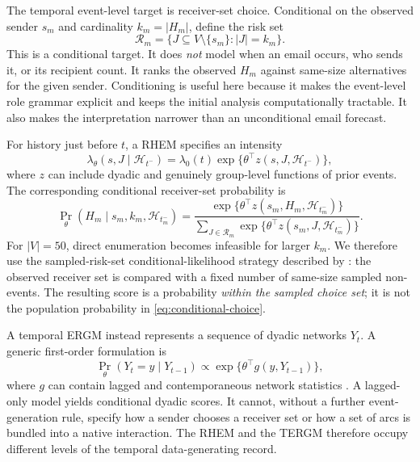 \documentclass[11pt]{article}
\newcommand{\Hist}{\mathcal{H}}
\newcommand{\Risk}{\mathcal{R}}
\begin{document}
The temporal event-level target is receiver-set choice. Conditional on the observed sender $s_m$ and cardinality $k_m=|H_m|$, define the risk set
\begin{equation}
 \Risk_m=\{J\subseteq V\setminus\{s_m\}:|J|=k_m\}.
 \label{eq:riskset}
\end{equation}
This is a conditional target. It does \emph{not} model when an email occurs, who sends it, or its recipient count. It ranks the observed $H_m$ against same-size alternatives for the given sender. Conditioning is useful here because it makes the event-level role grammar explicit and keeps the initial analysis computationally tractable. It also makes the interpretation narrower than an unconditional email forecast.

For history just before $t$, a RHEM specifies an intensity
\begin{equation}
 \lambda_\theta(s,J\mid\Hist_{t^-})=\lambda_0(t)\exp\{\theta^\top z(s,J,\Hist_{t^-})\},
 \label{eq:rhem-intensity}
\end{equation}
where $z$ can include dyadic and genuinely group-level functions of prior events. The corresponding conditional receiver-set probability is
\begin{equation}
 \Pr_\theta(H_m\mid s_m,k_m,\Hist_{t_m^-})=
 \frac{\exp\{\theta^\top z(s_m,H_m,\Hist_{t_m^-})\}}
 {\sum_{J\in\Risk_m}\exp\{\theta^\top z(s_m,J,\Hist_{t_m^-})\}}.
 \label{eq:conditional-choice}
\end{equation}
For $|V|=50$, direct enumeration becomes infeasible for larger $k_m$. We therefore use the sampled-risk-set conditional-likelihood strategy described by \citet{lernerLomi2023}: the observed receiver set is compared with a fixed number of same-size sampled non-events. The resulting score is a probability \emph{within the sampled choice set}; it is not the population probability in \eqref{eq:conditional-choice}.

A temporal ERGM instead represents a sequence of dyadic networks $Y_t$. A generic first-order formulation is
\begin{equation}
 \Pr_\theta(Y_t=y\mid Y_{t-1})\propto
 \exp\{\theta^\top g(y,Y_{t-1})\},
 \label{eq:tergm}
\end{equation}
where $g$ can contain lagged and contemporaneous network statistics \citep{hannekeEtAl2010,leifeldEtAl2018}. A lagged-only model yields conditional dyadic scores. It cannot, without a further event-generation rule, specify how a sender chooses a receiver set or how a set of arcs is bundled into a native interaction. The RHEM and the TERGM therefore occupy different levels of the temporal data-generating record.
\end{document}
